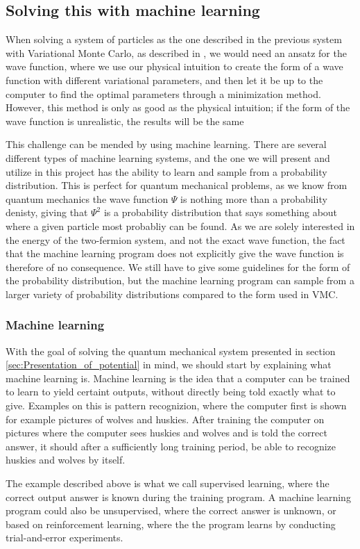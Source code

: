 \documentclass[norsk,a4paper,12pt]{article}
\begin{document}
\subsection{Solving this with machine learning}
When solving a system of particles as the one described in the previous system with Variational Monte Carlo, as described in \cite{Nordhagen}, we would need an ansatz for the wave function, where we use our physical intuition to create the form of a wave function with different variational parameters, and then let it be up to the computer to find the optimal parameters through a minimization method. However, this method is only as good as the physical intuition; if the form of the wave function is unrealistic, the results will be the same
\par 
\vspace{3mm}
This challenge can be mended by using machine learning. There are several different types of machine learning systems, and the one we will present and utilize in this project has the ability to learn and sample from a probability distribution. This is perfect for quantum mechanical problems, as we know from quantum mechanics the wave function $\Psi$ is nothing more than a probability denisty, giving that $\Psi^2$ is a probability distribution that says something about where a given particle most probabliy can be found. As we are solely interested in the energy of the two-fermion system, and not the exact wave function, the fact that the machine learning program does not explicitly give the wave function is therefore of no consequence. We still have to give some guidelines for the form of the probability distribution, but the machine learning program can sample from a larger variety of probability distributions compared to the form used in VMC.

\subsubsection{Machine learning}
With the goal of solving the quantum mechanical system presented in section \ref{sec:Presentation_of_potential} in mind, we should start by explaining what machine learning is. Machine learning is the idea that a computer can be trained to learn to yield certaint outputs, without directly being told exactly what to give. Examples on this is pattern recognizion, where the computer first is shown for example pictures of wolves and huskies. After training the computer on pictures where the computer sees huskies and wolves and is told the correct answer, it should after a sufficiently long training period, be able to recognize huskies and wolves by itself. 
\par 
\vspace{3mm}
The example described above is what we call supervised learning, where the correct output answer is known during the training program. A machine learning program could also be unsupervised, where the correct answer is unknown, or based on reinforcement learning, where the the program learns by conducting trial-and-error experiments. 
\par 
\vspace{3mm}
\end{document}
